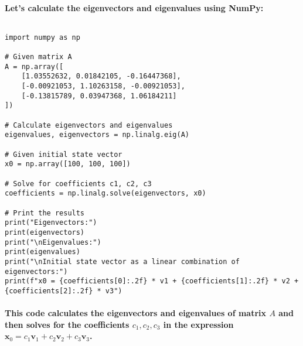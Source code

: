 \paragraph{Let's calculate the eigenvectors and eigenvalues using NumPy:}
% 
$$$$
% 
\begin{lstlisting}[style=pystyle]
import numpy as np

# Given matrix A
A = np.array([
    [1.03552632, 0.01842105, -0.16447368],
    [-0.00921053, 1.10263158, -0.00921053],
    [-0.13815789, 0.03947368, 1.06184211]
])

# Calculate eigenvectors and eigenvalues
eigenvalues, eigenvectors = np.linalg.eig(A)

# Given initial state vector
x0 = np.array([100, 100, 100])

# Solve for coefficients c1, c2, c3
coefficients = np.linalg.solve(eigenvectors, x0)

# Print the results
print("Eigenvectors:")
print(eigenvectors)
print("\nEigenvalues:")
print(eigenvalues)
print("\nInitial state vector as a linear combination of eigenvectors:")
print(f"x0 = {coefficients[0]:.2f} * v1 + {coefficients[1]:.2f} * v2 + {coefficients[2]:.2f} * v3")
\end{lstlisting}
% 
\paragraph{This code calculates the eigenvectors and eigenvalues of matrix \(A\) and then solves for the coefficients \(c_1, c_2, c_3\) in the expression \(\mathbf{x}_0 = c_1 \mathbf{v}_1 + c_2 \mathbf{v}_2 + c_3 \mathbf{v}_3\).}
% 






